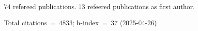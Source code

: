 74 refereed publications. 13 refeered publications as first author.

Total citations~=~4833; h-index~=~37 (2025-04-26)